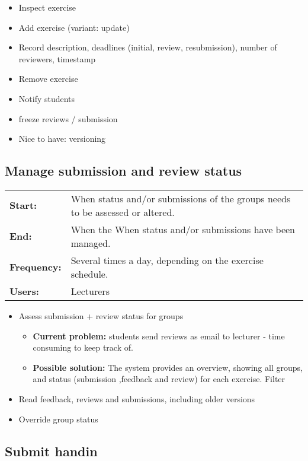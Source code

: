 \documentclass[Main]{subfiles}
\begin{document}
\begin{itemize}
\item Inspect exercise
\item Add exercise (variant: update)
\item Record description, deadlines (initial, review, resubmission), number of reviewers, timestamp
\item Remove exercise
\item Notify students
\item freeze reviews / submission
\item Nice to have: versioning
\end{itemize}

\subsection{Manage submission and review status}

\begin{longtable}{l p{13cm}}
 \textbf{Start:} & When status and/or submissions of the groups needs to be assessed or altered. \\
 \textbf{End:} & When the When status and/or submissions have been managed.  \\
 \textbf{Frequency:} & Several times a day, depending on the exercise schedule. \\
 \textbf{Users:} & Lecturers \\
\end{longtable}

\begin{itemize}
\item Assess submission + review status for groups
	\begin{itemize}
	\item \textbf{Current problem:} students send reviews as email to lecturer - time consuming to keep track of.
	\item \textbf{Possible solution:} The system provides an overview, showing all groups, and status (submission ,feedback and review) for each exercise. Filter  
	\end{itemize}
\item Read feedback, reviews and submissions, including older versions
\item Override group status
\end{itemize}

\subsection{Submit handin}
\end{document}
